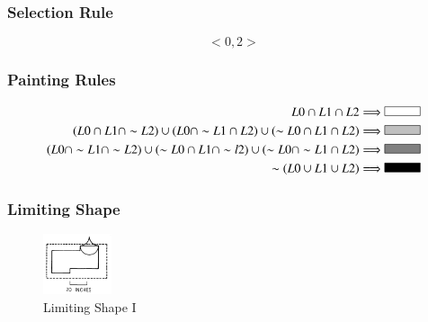 \documentclass[11pt, a4paper]{report}
\begin{document}
\subsubsection{Selection Rule}
\begin{equation}
<0,2>
\end{equation}

\subsubsection{Painting Rules}
\begin{align}
\label{fig:Shape Grammars/Shape Specification/Painting_Rule_1}
L0\cap L1\cap L2 \Longrightarrow  
\begin{tikzpicture}
    \filldraw[fill=black!00!white, draw=black] (0,0) rectangle (1,0.25);
\end{tikzpicture} \\
\label{fig:Shape Grammars/Shape Specification/Painting_Rule_2}
(L0\cap L1\cap \sim L2)\cup (L0\cap \sim L1\cap L2)\cup (\sim L0\cap L1 \cap L2) \Longrightarrow  
\begin{tikzpicture}
    \filldraw[fill=black!25!white, draw=black] (0,0) rectangle (1,0.25);
\end{tikzpicture} \\
\label{fig:Shape Grammars/Shape Specification/Painting_Rule_3}
(L0\cap \sim L1\cap \sim L2)\cup (\sim L0\cap L1\cap \sim l2)\cup (\sim L0\cap \sim L1 \cap L2) \Longrightarrow  
\begin{tikzpicture}
    \filldraw[fill=black!50!white, draw=black] (0,0) rectangle (1,0.25);
\end{tikzpicture} \\
\label{fig:Shape Grammars/Shape Specification/Painting_Rule_4}
\sim (L0\cup L1\cup L2)  \Longrightarrow  
\begin{tikzpicture}
    \filldraw[fill=black!100!white, draw=black] (0,0) rectangle (1,0.25);
\end{tikzpicture}
\end{align}
\subsubsection{Limiting Shape}
\begin{figure}[!h]
    \centering
    \includegraphics[width=2cm]{sg_specification_Limiting_shape.jpg}
    \caption{ Limiting Shape I \citep{shapeGrammars:1972}}\label{fig:Shape Grammars/Shape Specification/Limiting_Shape}
\end{figure}
\pagebreak
\end{document}
